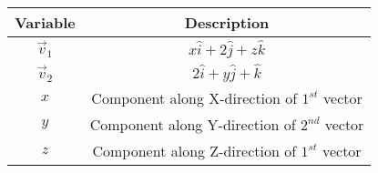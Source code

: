 \begin{tabular}[12pt]{ |c| c|}
    \hline
    \textbf{Variable} & \textbf{Description}\\ 
    \hline
    $\overrightarrow{v}_1$ & $x\hat{i}+2\hat{j}+z\hat{k}$\\
    \hline
    $\overrightarrow{v}_2$ & $2\hat{i}+y\hat{j}+\hat{k}$\\
    \hline 
    $x$ & Component along X-direction of $1^{st}$ vector\\
    \hline
    $y$ & Component along Y-direction of $2^{nd}$ vector\\
    \hline
    $z$ &Component along Z-direction of $1^{st}$ vector\\
    \hline   
    \end{tabular}
